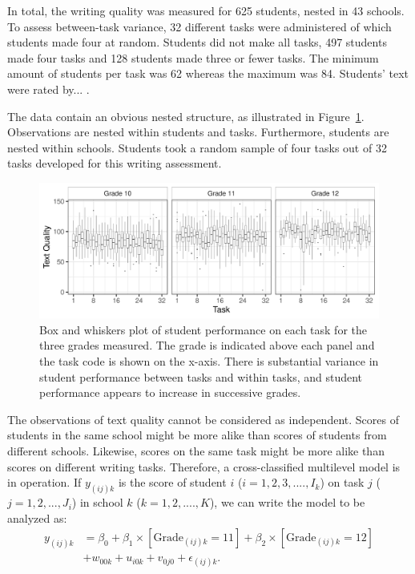 \documentclass[a4paper]{article}
\newcommand{\DON}	[1] 	{}
\begin{document}
In total, the writing quality was measured for 625 students, nested in 43 schools. To assess between-task variance, 32 different tasks were administered of which students made four at random. Students did not make all tasks, 497 students made four tasks and 128 students made three or fewer tasks. The minimum amount of students per task was 62 whereas the maximum was 84. Students' text were rated by... \DON{Aanvullen aub}.

The data contain an obvious nested structure, as illustrated in Figure~\ref{fig:baselineDescriptives}. Observations are nested within students and tasks. Furthermore, students are nested within schools. Students took a random sample of four tasks out of 32 tasks developed for this writing assessment.

\begin{figure}[!ht]
	\includegraphics[width=\textwidth]{descriptivesBaseline.pdf}
	\caption{Box and whiskers plot of student performance on each task for the three grades measured. The grade is indicated above each panel and the task code is shown on the x-axis. There is substantial variance in student performance between tasks and within tasks, and student performance appears to increase in successive grades.}
	\label{fig:baselineDescriptives}
\end{figure}
The observations of text quality cannot be considered as independent.
Scores of students in the same school might be more alike than scores of students from different schools.
Likewise, scores on the same task might be more alike than scores on different writing tasks.
Therefore, a cross-classified multilevel model is in operation.
If $y_{(ij)k}$ is the score of student $i$ ($i = 1, 2, 3, ...., I_k$) on task $j$ ($j = 1, 2, ..., J_i$) in school $k$ ($k = 1, 2, ...., K$), we can write the model to be analyzed as:
\begin{align*}
	y_{(ij)k} &= \beta_0 + \beta_1 \times [\mathrm{Grade}_{(ij)k}=11] + \beta_2 \times [\mathrm{Grade}_{(ij)k}=12]\\
			  &+ w_{00k} + u_{i0k} + v_{0j0} + \epsilon_{(ij)k}.
\end{align*}
\end{document}
